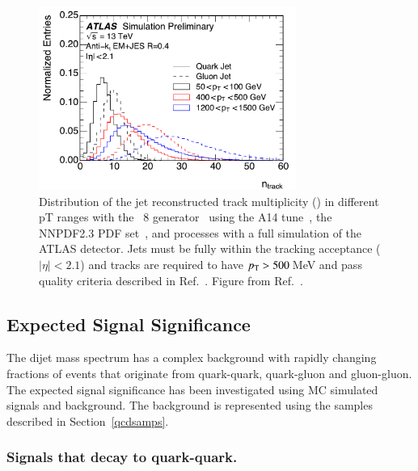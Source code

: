 \begin{figure}[htb]
 \centering
\includegraphics[width=0.75\textwidth]{figures/tagging/fig_01_ATL-PHYS-PUB-2017-009.pdf}
\caption{Distribution of the jet reconstructed track multiplicity (\ntrk ) in
 different pT ranges with the \Pythia~8 generator~\cite{pythia8} using
 the A14 tune~\cite{A14tune}, the NNPDF2.3 PDF
 set~\cite{Carrazza:2013axa}, and processes with a full simulation of the
 ATLAS detector. Jets must be fully within the tracking acceptance
 ($|\eta|<2.1$) and tracks are required to have $p_{\mathrm T} > 500$\,MeV and pass
  quality criteria described in Ref.~\cite{ATL-PHYS-PUB-2017-009}. Figure
 from Ref.~\cite{ATL-PHYS-PUB-2017-009}. \label{fig:jet_pt_quark_gluon}}
\end{figure}


\subsection{Expected Signal Significance}
\label{sec:ExpectedSig}

The dijet mass spectrum has a complex background with rapidly changing  fractions of events that originate 
from quark-quark, quark-gluon and gluon-gluon. The expected signal significance has been investigated using 
MC simulated  signals and background. The background is represented using the \QCD samples described 
in Section~\ref{qcdsamps}. 

\subsubsection{Signals that decay to quark-quark.}

